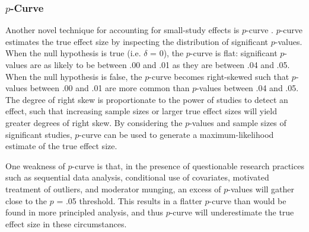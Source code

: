 \documentclass[man]{apa6}
\begin{document}
\subsubsection{$p$-Curve}
Another novel technique for accounting for small-study effects is $p$-curve \citep{Simonsohn:etal:2014}. $p$-curve estimates the true effect size by inspecting the distribution of significant $p$-values. When the null hypothesis is true (i.e. $\delta$ = 0), the $p$-curve is flat: significant $p$-values are as likely to be between .00 and .01 as they are between .04 and .05. When the null hypothesis is false, the $p$-curve becomes right-skewed such that $p$-values between .00 and .01 are more common than $p$-values between .04 and .05. The degree of right skew is proportionate to the power of studies to detect an effect, such that increasing sample sizes or larger true effect sizes will yield greater degrees of right skew. By considering the $p$-values and sample sizes of significant studies, $p$-curve can be used to generate a maximum-likelihood estimate of the true effect size.

One weakness of $p$-curve is that, in the presence of questionable research practices such as sequential data analysis, conditional use of covariates, motivated treatment of outliers, and moderator munging, an excess of $p$-values will gather close to the $p$ = .05 threshold. This results in a flatter $p$-curve than would be found in more principled analysis, and thus $p$-curve will underestimate the true effect size in these circumstances.
\end{document}
